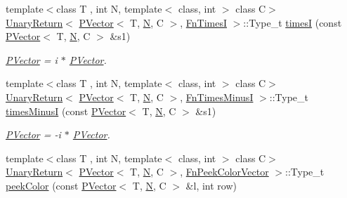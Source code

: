 \begin{DoxyCompactItemize}
\item 
{\footnotesize template$<$class T , int N, template$<$ class, int $>$ class C$>$ }\\\mbox{\hyperlink{structENSEM_1_1UnaryReturn}{Unary\+Return}}$<$ \mbox{\hyperlink{classENSEM_1_1PVector}{P\+Vector}}$<$ T, \mbox{\hyperlink{operator__name__util_8cc_a7722c8ecbb62d99aee7ce68b1752f337}{N}}, C $>$, \mbox{\hyperlink{structENSEM_1_1FnTimesI}{Fn\+TimesI}} $>$\+::Type\+\_\+t \mbox{\hyperlink{group__primvector_ga0c6f467326b48a0fafa4b42ce712d0c1}{timesI}} (const \mbox{\hyperlink{classENSEM_1_1PVector}{P\+Vector}}$<$ T, \mbox{\hyperlink{operator__name__util_8cc_a7722c8ecbb62d99aee7ce68b1752f337}{N}}, C $>$ \&s1)
\begin{DoxyCompactList}\small\item\em \mbox{\hyperlink{classENSEM_1_1PVector}{P\+Vector}} = i $\ast$ \mbox{\hyperlink{classENSEM_1_1PVector}{P\+Vector}}. \end{DoxyCompactList}\item 
{\footnotesize template$<$class T , int N, template$<$ class, int $>$ class C$>$ }\\\mbox{\hyperlink{structENSEM_1_1UnaryReturn}{Unary\+Return}}$<$ \mbox{\hyperlink{classENSEM_1_1PVector}{P\+Vector}}$<$ T, \mbox{\hyperlink{operator__name__util_8cc_a7722c8ecbb62d99aee7ce68b1752f337}{N}}, C $>$, \mbox{\hyperlink{structENSEM_1_1FnTimesMinusI}{Fn\+Times\+MinusI}} $>$\+::Type\+\_\+t \mbox{\hyperlink{group__primvector_gaa73c49a7eea92a59f41ed2ae3deeab2f}{times\+MinusI}} (const \mbox{\hyperlink{classENSEM_1_1PVector}{P\+Vector}}$<$ T, \mbox{\hyperlink{operator__name__util_8cc_a7722c8ecbb62d99aee7ce68b1752f337}{N}}, C $>$ \&s1)
\begin{DoxyCompactList}\small\item\em \mbox{\hyperlink{classENSEM_1_1PVector}{P\+Vector}} = -\/i $\ast$ \mbox{\hyperlink{classENSEM_1_1PVector}{P\+Vector}}. \end{DoxyCompactList}\item 
{\footnotesize template$<$class T , int N, template$<$ class, int $>$ class C$>$ }\\\mbox{\hyperlink{structENSEM_1_1UnaryReturn}{Unary\+Return}}$<$ \mbox{\hyperlink{classENSEM_1_1PVector}{P\+Vector}}$<$ T, \mbox{\hyperlink{operator__name__util_8cc_a7722c8ecbb62d99aee7ce68b1752f337}{N}}, C $>$, \mbox{\hyperlink{structENSEM_1_1FnPeekColorVector}{Fn\+Peek\+Color\+Vector}} $>$\+::Type\+\_\+t \mbox{\hyperlink{group__primvector_ga69a1dd204a81451dda8a8a886a17b5c9}{peek\+Color}} (const \mbox{\hyperlink{classENSEM_1_1PVector}{P\+Vector}}$<$ T, \mbox{\hyperlink{operator__name__util_8cc_a7722c8ecbb62d99aee7ce68b1752f337}{N}}, C $>$ \&l, int row)

\end{DoxyCompactItemize}

